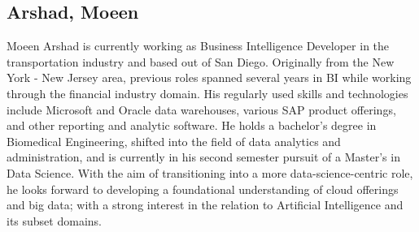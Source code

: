 \subsection{Arshad, Moeen}

Moeen Arshad is currently working as Business Intelligence Developer
in the transportation industry and based out of San Diego. Originally
from the New York - New Jersey area, previous roles spanned several
years in BI while working through the financial industry domain. His
regularly used skills and technologies include Microsoft and Oracle
data warehouses, various SAP product offerings, and other reporting
and analytic software. He holds a bachelor's degree in Biomedical
Engineering, shifted into the field of data analytics and
administration, and is currently in his second semester pursuit of a
Master's in Data Science.  With the aim of transitioning into a more
data-science-centric role, he looks forward to developing a
foundational understanding of cloud offerings and big data; with a
strong interest in the relation to Artificial Intelligence and its
subset domains.
